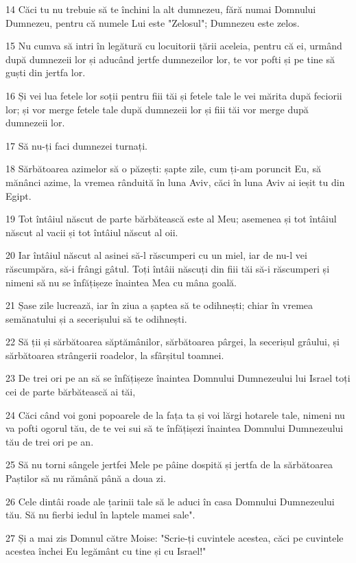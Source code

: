 \par 14 Căci tu nu trebuie să te închini la alt dumnezeu, fără numai Domnului Dumnezeu, pentru că numele Lui este "Zelosul"; Dumnezeu este zelos.
\par 15 Nu cumva să intri în legătură cu locuitorii țării aceleia, pentru că ei, urmând după dumnezeii lor și aducând jertfe dumnezeilor lor, te vor pofti și pe tine să guști din jertfa lor.
\par 16 Și vei lua fetele lor soții pentru fiii tăi și fetele tale le vei mărita după feciorii lor; și vor merge fetele tale după dumnezeii lor și fiii tăi vor merge după dumnezeii lor.
\par 17 Să nu-ți faci dumnezei turnați.
\par 18 Sărbătoarea azimelor să o păzești: șapte zile, cum ți-am poruncit Eu, să mănânci azime, la vremea rânduită în luna Aviv, căci în luna Aviv ai ieșit tu din Egipt.
\par 19 Tot întâiul născut de parte bărbătească este al Meu; asemenea și tot întâiul născut al vacii și tot întâiul născut al oii.
\par 20 Iar întâiul născut al asinei să-l răscumperi cu un miel, iar de nu-l vei răscumpăra, să-i frângi gâtul. Toți întâii născuți din fiii tăi să-i răscumperi și nimeni să nu se înfățișeze înaintea Mea cu mâna goală.
\par 21 Șase zile lucrează, iar în ziua a șaptea să te odihnești; chiar în vremea semănatului și a secerișului să te odihnești.
\par 22 Să ții și sărbătoarea săptămânilor, sărbătoarea pârgei, la secerișul grâului, și sărbătoarea strângerii roadelor, la sfârșitul toamnei.
\par 23 De trei ori pe an să se înfățișeze înaintea Domnului Dumnezeului lui Israel toți cei de parte bărbătească ai tăi,
\par 24 Căci când voi goni popoarele de la fața ta și voi lărgi hotarele tale, nimeni nu va pofti ogorul tău, de te vei sui să te înfățișezi înaintea Domnului Dumnezeului tău de trei ori pe an.
\par 25 Să nu torni sângele jertfei Mele pe pâine dospită și jertfa de la sărbătoarea Paștilor să nu rămână până a doua zi.
\par 26 Cele dintâi roade ale țarinii tale să le aduci în casa Domnului Dumnezeului tău. Să nu fierbi iedul în laptele mamei sale".
\par 27 Și a mai zis Domnul către Moise: "Scrie-ți cuvintele acestea, căci pe cuvintele acestea închei Eu legământ cu tine și cu Israel!"
